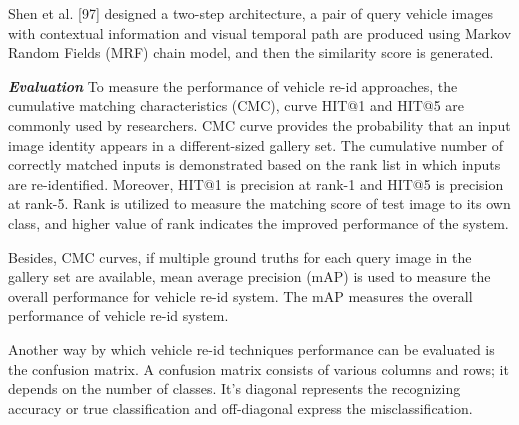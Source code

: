 Shen et al. [97] designed a two-step architecture, a pair of query vehicle
images with contextual information and visual temporal path are produced using Markov
Random Fields (MRF) chain model, and then the similarity score is generated.






\textbf{\textit{Evaluation}}
To measure the performance of vehicle re-id approaches, the
cumulative matching characteristics (CMC), curve HIT@1 and HIT@5 are commonly used
by researchers. CMC curve provides the probability that an input image identity appears in a different-sized gallery set. The cumulative number of correctly
matched inputs is demonstrated based on the rank list in which inputs are re-identified.
Moreover, HIT@1 is precision at rank-1 and HIT@5 is precision at rank-5. Rank is utilized to
measure the matching score of test image to its own class, and higher value of rank indicates
the improved performance of the system. 


Besides, CMC curves, if
multiple ground truths for each query image in the gallery set are available, mean average
precision (mAP) is used to measure the overall performance for vehicle re-id system. The mAP measures the overall performance of vehicle re-id system.

Another way by which vehicle re-id techniques performance can be evaluated is the
confusion matrix. A confusion matrix consists of various columns and rows; it depends on
the number of classes. It’s diagonal represents the recognizing accuracy or true classification
and off-diagonal express the misclassification.